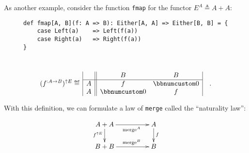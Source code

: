 As another example, consider the function \lstinline!fmap! for the
functor $E^{A}\triangleq A+A$:

\begin{wrapfigure}{L}{0.6\columnwidth}%
\vspace{-0.8\baselineskip}
\begin{lstlisting}
def fmap[A, B](f: A => B): Either[A, A] => Either[B, B] = {
    case Left(a)    => Left(f(a))
    case Right(a)   => Right(f(a))
}
\end{lstlisting}

\vspace{-1.65\baselineskip}
\end{wrapfigure}%

~\vspace{-1.45\baselineskip}
\[
(f^{:A\rightarrow B})^{\uparrow E}\triangleq\,\begin{array}{|c||cc|}
 & B & B\\
\hline A & f & \bbnum 0\\
A & \bbnum 0 & f
\end{array}\quad.
\]
\vspace{-0.7\baselineskip}

With this definition, we can formulate a law of \lstinline!merge!
called the \textsf{``}naturality law\textsf{''}:

\begin{wrapfigure}{L}{0.3\columnwidth}%
\vspace{-2\baselineskip}
\[
\xymatrix{\xyScaleY{1.6pc}\xyScaleX{4.0pc}A+A\ar[d]\sb(0.45){f^{\uparrow E}}\ar[r]\sb(0.55){\text{merge}^{A}} & A\ar[d]\sp(0.45){f}\\
B+B\ar[r]\sp(0.55){\text{merge}^{B}} & B
}
\]
\vspace{-0.1\baselineskip}
\end{wrapfigure}%

